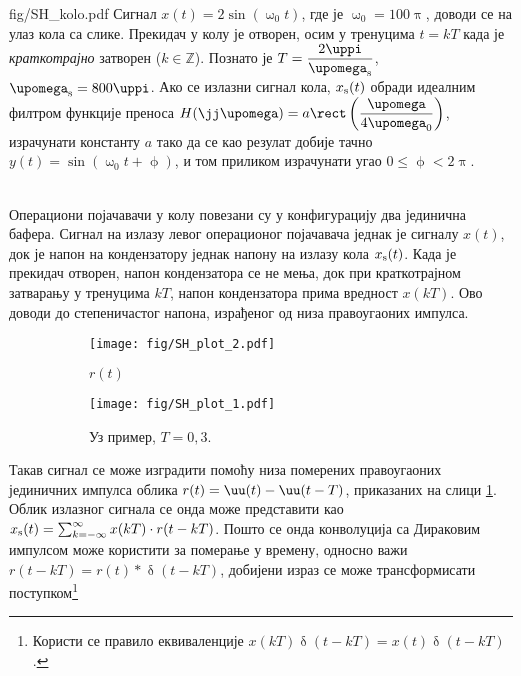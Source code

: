 \begin{slikaDesno}{fig/SH_kolo.pdf}
\PID Сигнал $x(t) = 2\sin\left( \upomega_0 t\right)$,
где је $\upomega_0 = 100\uppi$, доводи се на улаз кола са слике. Прекидач у колу је отворен, осим у 
тренуцима $t = kT$ када је \textit{краткотрајно} затворен ($k \in \mathbb Z$). 
Познато је $T = \dfrac{2\uppi}{\upomega_{\rm s}}$, $\upomega_{\rm s} = 800\uppi$.
Ако се излазни сигнал кола, $x_{\rm s}(t)$ 
обради идеалним филтром функције преноса $H(\jj\upomega) = 
a \rect\left(\dfrac{\upomega}{4\upomega_0} \right)$, 
израчунати константу $a$ тако да се као резулат добије тачно 
$y(t) = \sin\left( \upomega_0 t + \upphi \right)$, и том приликом израчунати угао $0 \leq \upphi < 2\uppi$.
\end{slikaDesno} \\


\RESENJE  Операциони појачавачи у колу повезани су у конфигурацију два јединична 
бафера. Сигнал на излазу левог операционог појачавача једнак је сигналу $x(t)$, 
док је напон на кондензатору једнак напону на излазу кола $x_{\rm s}(t)$. Када је прекидач отворен, 
напон кондензатора се не мења, док при краткотрајном затварању у тренуцима $kT$, напон кондензатора 
прима вредност $x(kT)$. Ово доводи до степеничастог напона, израђеног од низа правоугаоних импулса.

\begin{figure}[hb!]
    \begin{subfigure}[t]{0.35\textwidth}
        \centering
        \texttt{[image: fig/SH\_plot\_2.pdf]}
        \caption{$r(t)$}        
        \label{fig:\ID.pulse}
    \end{subfigure}
    \hfill
    \begin{subfigure}[t]{0.55\textwidth}
        \centering
        \texttt{[image: fig/SH\_plot\_1.pdf]}
        \caption{Уз пример, $T = 0,3$.}        
        \label{fig:\ID.primer}
    \end{subfigure}
    \caption{}
\end{figure}

Такав сигнал се може изградити помоћу низа померених правоугаоних јединичних импулса 
облика ${r(t) = \uu(t) - \uu(t - T)}$,
приказаних на слици \ref{fig:\ID.pulse}. Облик излазног сигнала се онда може представити као 
$x_{\rm s}(t) = \sum_{k = -\infty}^{\infty} x(kT) \cdot r(t - kT)$. Пошто се онда
конволуција са Дираковим импулсом може користити за померање у времену, односно важи
$r(t - kT) = r(t) \ast \updelta(t - kT)$, добијени израз се може трансформисати 
поступком\footnote{Користи се правило еквиваленције 
$x(kT) \updelta(t - kT) = x(t) \updelta(t - kT)$. }
  

